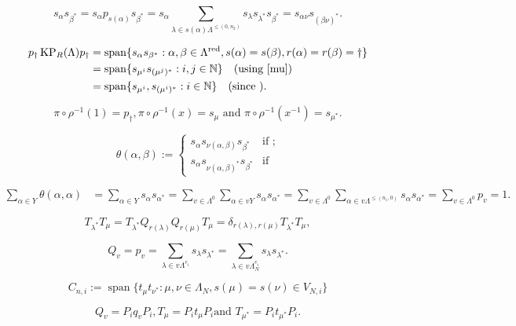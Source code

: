 \documentclass[a4paper,12pt]{article}
\begin{document}
\begin{equation}\label{mu}
s_\alpha s_{\beta^*}=s_\alpha p_{s(\alpha)}s_{\beta^*}=s_\alpha\sum_{\lambda\in s(\alpha)\Lambda^{\leq(0,n_2)}}s_\lambda s_{\lambda^*}s_{\beta^*}=s_{\alpha\nu}s_{(\beta\nu)^*}.
\end{equation}

\begin{align*}
p_{\dagger}\operatorname{KP}_R(\Lambda)p_{\dagger}&={\operatorname{\mathrm{span}}}\{s_\alpha s_{\beta^*}: \alpha,\beta\in\Lambda^{{\operatorname{\mathrm{red}}}}, s(\alpha)=s(\beta), r(\alpha)=r(\beta)=\dagger\}\\
&={\operatorname{\mathrm{span}}}\{s_{\mu^i} s_{(\mu^j)^*}:i,j\in{\mathbb{N}}\} \quad\text{(using \eqref{mu})}\\
&={\operatorname{\mathrm{span}}}\{s_{\mu^i}, s_{(\mu^i)^*}:i\in{\mathbb{N}}\}\quad\text{(since )}.
\end{align*}

\[\pi\circ\rho^{-1}(1)=p_\dagger, \pi\circ\rho^{-1}(x)=s_\mu \text{ and } \pi\circ\rho^{-1}(x^{-1})=s_{\mu^*}.\]

\begin{equation}\label{matrixunits}
 \theta(\alpha,\beta):=\begin{cases}s_\alpha s_{\nu(\alpha,\beta)}s_{\beta^*}  
 &\text{if };\\
 s_\alpha s_{\nu(\alpha,\beta)^*}s_{\beta^*}  &\text{if }
 \end{cases}
 \end{equation}

\begin{align*}\sum_{\alpha\in Y} \theta(\alpha,\alpha)&=\sum_{\alpha\in Y} s_\alpha s_{\alpha^*}=\sum_{v\in\Lambda^0}\sum_{\alpha\in vY}s_\alpha s_{\alpha^*}
=\sum_{v\in\Lambda^0}\sum_{\alpha\in v\Lambda^{\leq (n_1,0)}}s_\alpha s_{\alpha^*}=\sum_{v\in\Lambda^0}p_v=1.
\end{align*}

\[
T_{\lambda^*}T_\mu=T_{\lambda^*}Q_{r(\lambda)}Q_{r(\mu)}T_\mu=\delta_{r(\lambda), r(\mu)}T_{\lambda^*}T_\mu,\]

\[Q_v=p_v=\sum_{\lambda\in v\Lambda^{e_i}}s_\lambda s_{\lambda^*}= \sum_{\lambda\in v\Lambda_N^{e_i}}s_\lambda s_{\lambda^*}.\]

\[C_{n,i}:={\operatorname{\mathrm{span}}}\{t_\mu t_{\nu^*}:\mu,\nu\in\Lambda_N, s(\mu)=s(\nu)\in V_{N,i}\}\]

\[Q_v=P_iq_v P_i, T_\mu=P_i t_\mu P_i \text {and } T_{\mu^*}=P_i t_{\mu^*} P_i.\]
\end{document}
